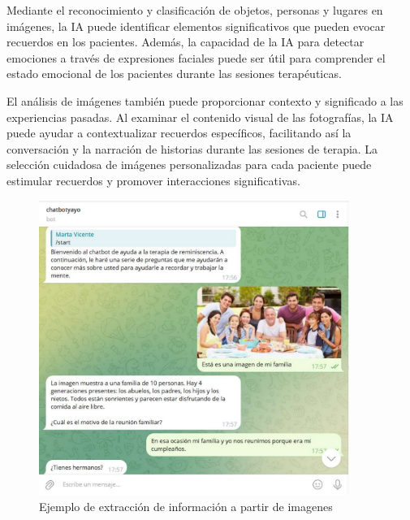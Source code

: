 Mediante el reconocimiento y clasificación de objetos, personas y lugares en imágenes, la IA puede identificar elementos significativos que pueden evocar recuerdos en los pacientes. Además, la capacidad de la IA para detectar emociones a través de expresiones faciales puede ser útil para comprender el estado emocional de los pacientes durante las sesiones terapéuticas.

El análisis de imágenes también puede proporcionar contexto y significado a las experiencias pasadas. Al examinar el contenido visual de las fotografías, la IA puede ayudar a contextualizar recuerdos específicos, facilitando así la conversación y la narración de historias durante las sesiones de terapia. La selección cuidadosa de imágenes personalizadas para cada paciente puede estimular recuerdos y promover interacciones significativas. 

\begin{figure}[h]
	\centering
	\includegraphics[width=0.9\textwidth]{Imagenes/extracInfoImag}
	\caption{Ejemplo de extracción de información a partir de imagenes}
	\label{fig:interfazPrototipo1}
\end{figure}

